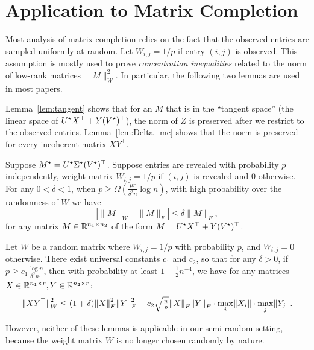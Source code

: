 
\section{Application to Matrix Completion}
\label{sec:matcomp}
Most analysis of matrix completion relies on the fact that the observed entries are sampled uniformly at random. Let $W_{i,j} = 1/p$ if entry $(i,j)$ is observed. This assumption is mostly used to prove {\em concentration inequalities} related to the norm of low-rank matrices $\|M\|_W^2$.  In particular, the following two lemmas are used in most papers.

Lemma~\ref{lem:tangent} shows that for an $M$ that is in the ``tangent space'' (the linear space of $U^\star X^\top + Y(V^\star)^\top$), the norm of $Z$ is preserved after we restrict to the observed entries. 
Lemma~\ref{lem:Delta_mc} shows that the norm is preserved for every incoherent matrix $XY^\top$.

\begin{lemma}
\label{lem:tangent}
Suppose $M^\star = U^\star\Sigma^\star(V^\star)^\top$. Suppose entries are revealed with probability $p$ independently, weight matrix $W_{i,j} = 1/p$ if $(i,j)$ is revealed and $0$ otherwise. 
For any $0 < \delta < 1$, when $p \ge \Omega(\frac{\mu r}{\delta^2 n} \log n)$, with high probability over the randomness of $W$ we have
\[
|\|M\|_W - \|M\|_F| \le \delta \|M\|_F,
\]
for any matrix $M\in \mathbb{R}^{n_1\times n_2}$ of the form $M = U^\star X^\top + Y(V^\star)^\top$.
\end{lemma}

\begin{lemma}
\label{lem:Delta_mc}
Let $W$ be a random matrix where $W_{i,j} = 1/p$ with probability $p$, and $W_{i,j} = 0$ otherwise.
There exist universal constants $c_1$ and $c_2$, so that for any $\delta>0$, if $p \ge c_1  \frac{\log n}{\delta^2 n_1}$, then with probability at least $1-\frac{1}{2}n^{-4}$, we have for any matrices $X \in \mathbb{R}^{n_1\times r}, Y\in\mathbb{R}^{n_2\times r}$:
\begin{equation*}
\lVert XY^\top{\rVert}^2_{W}  \le (1+\delta) \lVert X{\rVert}_F^2\lVert Y{\rVert}_F^2 + c_2 \sqrt{\tfrac{n}{p}}\lVert X{\rVert}_F\lVert Y{\rVert}_F\cdot \max_i\lVert X_i{\rVert} \cdot \max_j\lVert Y_j{\rVert}.
\end{equation*}
\end{lemma}

However, neither of these lemmas is applicable in our semi-random setting, because the weight matrix $W$ is no longer chosen randomly by nature.

